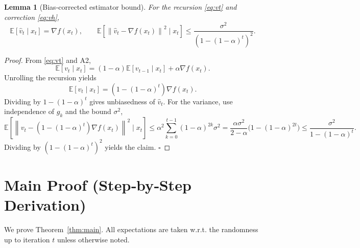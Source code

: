 \documentclass{article}
\newtheorem{lemma}{Lemma}
\newcommand{\E}{\mathbb{E}}
\newcommand{\norm}[1]{\left\|#1\right\|}
\newcommand{\grad}{\nabla}
\begin{document}
\begin{lemma}[Bias‑corrected estimator bound]
\label{lem:biased}
For the recursion \eqref{eq:vt} and correction \eqref{eq:vh},
\[
\E\!\left[\hat v_t\mid x_t\right]=\grad f(x_t),\qquad
\E\!\left[\norm{\hat v_t-\grad f(x_t)}^2\mid x_t\right]\le
\frac{\sigma^2}{(1-(1-\alpha)^t)^2}.
\]
\end{lemma}
\begin{proof}
From \eqref{eq:vt} and A2,
\[
\E[v_t\mid x_t]=(1-\alpha)\E[v_{t-1}\mid x_t]+\alpha\grad f(x_t).
\]
Unrolling the recursion yields
\[
\E[v_t\mid x_t]=(1-(1-\alpha)^t)\grad f(x_t).
\]
Dividing by $1-(1-\alpha)^t$ gives unbiasedness of $\hat v_t$.
For the variance, use independence of $g_k$ and the bound $\sigma^2$,
\[
\E\!\left[\norm{v_t-(1-(1-\alpha)^t)\grad f(x_t)}^2\mid x_t\right]
\le \alpha^2\sum_{k=0}^{t-1}(1-\alpha)^{2k}\sigma^2
= \frac{\alpha\sigma^2}{2-\alpha}\bigl(1-(1-\alpha)^{2t}\bigr)
\le\frac{\sigma^2}{1-(1-\alpha)^t}.
\]
Dividing by $(1-(1-\alpha)^t)^2$ yields the claim. \hfill$\square$
\end{proof}

\section*{Main Proof (Step‑by‑Step Derivation)}
We prove Theorem~\ref{thm:main}.  
All expectations are taken w.r.t. the randomness up to iteration $t$ unless
otherwise noted.
\end{document}
